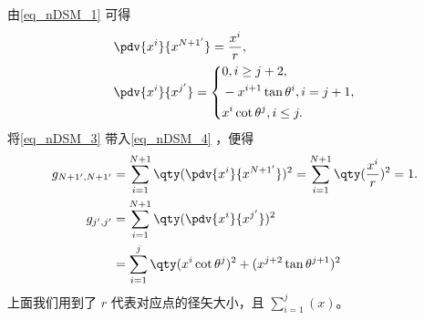 由\autoref{eq_nDSM_1} 可得
\begin{equation}\label{eq_nDSM_3}
\begin{aligned}
&\pdv{x^{i}}{x^{N+1'}}=\frac{x^{i}}{r},\\
&\pdv{x^{i}}{x^{j'}}=\left\{\begin{aligned}
&0,i\geq j+2,\\
&-x^{i+1}\tan\theta^i,i=j+1,\\
&x^i\cot\theta^j,i\leq j.
\end{aligned}\right.
\end{aligned}~
\end{equation}
将\autoref{eq_nDSM_3} 带入\autoref{eq_nDSM_4} ，便得
\begin{equation}
\begin{aligned}
g_{N+1',N+1'}&=\sum_{i=1}^{N+1}\qty(\pdv{x^i}{x^{N+1'}})^2=\sum_{i=1}^{N+1}\qty(\frac{x^{i}}{r})^2=1.\\
g_{j',j'}&=\sum_{i=1}^{N+1}\qty(\pdv{x^i}{x^{j'}})^2\\
&=\sum_{i=1}^{j}\qty(x^i\cot\theta^j)^2+(x^{j+2}\tan\theta^{j+1})^2\\
\end{aligned}~
\end{equation}
上面我们用到了 $r$ 代表对应点的径矢大小，且 $\sum_{i=1}^{j}(x)$。


























